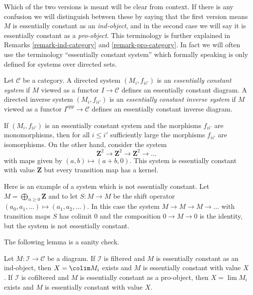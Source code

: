 \noindent
Which of the two versions is meant will be clear from context. If there is
any confusion we will distinguish between these by saying that the first
version means $M$ is essentially constant as an {\it ind-object}, and in
the second case we will say it is essentially constant as a {\it pro-object}.
This terminology is further explained in
Remarks \ref{remark-ind-category} and \ref{remark-pro-category}.
In fact we will often use the terminology ``essentially constant system''
which formally speaking is only defined for systems over directed sets.

\begin{definition}
\label{definition-essentially-constant-system}
Let $\mathcal{C}$ be a category. A directed system
$(M_i, f_{ii'})$ is an {\it essentially constant system}
if $M$ viewed as a functor $I \to \mathcal{C}$
defines an essentially constant diagram. A directed inverse system
$(M_i, f_{ii'})$ is an {\it essentially constant inverse system} if
$M$ viewed as a functor $I^{opp} \to \mathcal{C}$ defines an
essentially constant inverse diagram.
\end{definition}

\noindent
If $(M_i, f_{ii'})$ is an essentially constant system and the morphisms
$f_{ii'}$ are monomorphisms, then for all $i \leq i'$ sufficiently large the
morphisms $f_{ii'}$ are isomorphisms. On the other hand, consider the system
$$
\mathbf{Z}^2 \to \mathbf{Z}^2 \to \mathbf{Z}^2 \to \ldots
$$
with maps given by $(a, b) \mapsto (a + b, 0)$. This system is essentially
constant with value $\mathbf{Z}$ but every transition map has a kernel.

\medskip\noindent
Here is an example of a system which is not essentially constant. Let
$M = \bigoplus_{n \geq 0} \mathbf{Z}$ and to let $S : M \to M$ be the
shift operator $(a_0, a_1, \ldots) \mapsto (a_1, a_2, \ldots)$. In this
case the system $M \to M \to M \to \ldots$ with transition maps $S$
has colimit $0$ and the composition $0 \to M \to 0$ is the identity,
but the system is not essentially constant.

\medskip\noindent
The following lemma is a sanity check.

\begin{lemma}
\label{lemma-essentially-constant-is-limit-colimit}
Let $M : \mathcal{I} \to \mathcal{C}$ be a diagram.
If $\mathcal{I}$ is filtered and $M$ is essentially
constant as an ind-object, then $X = \colim M_i$ exists and $M$
is essentially constant with value $X$.
If $\mathcal{I}$ is cofiltered and $M$ is essentially
constant as a pro-object, then $X = \lim M_i$ exists and $M$ is
essentially constant with value $X$.
\end{lemma}

